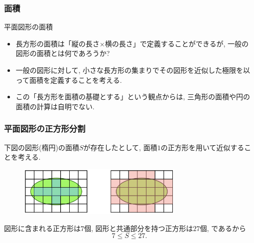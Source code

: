 \documentclass[dvipdfmx,cjk,10.2pt]{beamer}
\theoremstyle{definition}
\begin{document}
\begin{frame}
\frametitle{面積}

平面図形の面積

\begin{itemize}
\item 長方形の面積は「縦の長さ$\times$横の長さ」で定義することができるが, 一般の図形の面積とは何であろうか? 
\item 一般の図形に対して, 小さな長方形の集まりでその図形を近似した極限を以って面積を定義することを考える. 
\item この「長方形を面積の基礎とする」という観点からは, 三角形の面積や円の面積の計算は自明でない. 
\end{itemize}

\end{frame}




\begin{frame}
\frametitle{平面図形の正方形分割}
下図の図形(楕円)の面積$S$が存在したとして, 
面積$1$の正方形を用いて近似することを考える. 

\begin{figure}[htbp]
 \begin{center} 
  \includegraphics[width=80mm]{cover.png}
 \end{center}
\end{figure}

図形に含まれる正方形は$7$個, 図形と共通部分を持つ正方形は$27$個, であるから
$$
7 \le S \le 27. 
$$

\end{frame}

\end{document}
